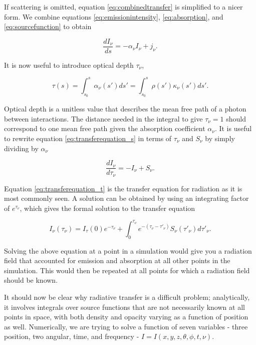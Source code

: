 If scattering is omitted, equation \ref{eq:combinedtransfer} is simplified to a nicer form. We combine equations \ref{eq:emissionintensity}, \ref{eq:absorption}, and \ref{eq:sourcefunction} to obtain

\begin{equation}
\label{eq:transferequation_s}
\frac{dI_{\nu}}{ds} = -\alpha_{\nu}I_{\nu} + j_{\nu}.
\end{equation}

It is now useful to introduce optical depth $\tau_{\nu}$,

\begin{equation}
\label{eq:opticaldepth}
\tau(s) = \int_{s_0}^{s} \alpha_{\nu}(s')ds' = \int_{s_0}^{s} \rho(s') \kappa_{\nu}(s') ds'.
\end{equation}

Optical depth is a unitless value that describes the mean free path of a photon between interactions. The distance needed in the integral to give $\tau_{\nu} = 1$ should correspond to one mean free path given the absorption coefficient $\alpha_{\nu}$. It is useful to rewrite equation \ref{eq:transferequation_s} in terms of $\tau_{\nu}$ and $S_{\nu}$ by simply dividing by $\alpha_{\nu}$

\begin{equation}
\label{eq:transferequation_t}
\frac{dI_{\nu}}{d\tau_{\nu}} = -I_{\nu} + S_{\nu}.
\end{equation}

Equation \ref{eq:transferequation_t} is the transfer equation for radiation as it is most commonly seen. A solution can be obtained by using an integrating factor of $e^{\tau_{\nu}}$, which gives the formal solution to the transfer equation

\begin{equation}
\label{eq:transferequationsolution}
I_{\nu}(\tau_{\nu}) = I_{\tau}(0)e^{-\tau_{\nu}} + \int_0^{\tau_{\nu}} e^{-(\tau_\nu - \tau'_{\nu})} S_{\nu}(\tau'_{\nu})d\tau'_{\nu}.
\end{equation}

Solving the above equation at a point in a simulation would give you a radiation field that accounted for emission and absorption at all other points in the simulation. This would then be repeated at all points for which a radiation field should be known.

It should now be clear why radiative transfer is a difficult problem; analytically, it involves integrals over source functions that are not necessarily known at all points in space, with both density and opacity varying as a function of position as well. Numerically, we are trying to solve a function of seven variables - three position, two angular, time, and frequency - $I = I(x,y,z,\theta,\phi,t,\nu)$.


